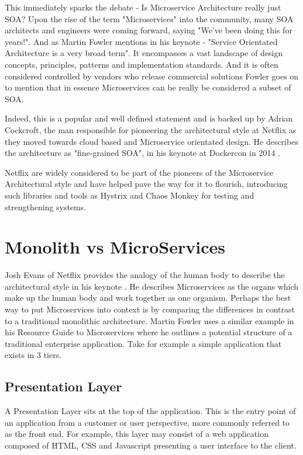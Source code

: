 This immediately sparks the debate - Is Microservice Architecture really just SOA? Upon the rise of the term "Microservices" into the community, many SOA architects and engineers were coming forward, saying "We've been doing this for years!". And as Martin Fowler mentions in his keynote\cite{GOTOConference} -  "Service Orientated Architecture is a very broad term". It encompasses a vast landscape of design concepts, principles, patterns and implementation standards. And it is often considered controlled by vendors who release commercial solutions Fowler goes on to mention that in essence Microservices can be really be considered a subset of SOA.

Indeed, this is a popular and well defined statement and is backed up by Adrian Cockcroft, the man responsible for pioneering the architectural style at Netflix as they moved towards cloud based and Microservice orientated design. He describes the architecture as "fine-grained SOA", in his keynote at Dockercon in 2014 \cite{adriancockcroft}.

Netflix are widely considered to be part of the pioneers of the Microservice Architectural style and have helped pave the way for it to flourish, introducing such libraries and tools as Hystrix\cite{Hystrix} and Chaos Monkey\cite{ChaosMonkey} for testing and strengthening systems.

\section{Monolith vs MicroServices}

Josh Evans of Netflix provides the analogy of the human body to describe the architectural style in his keynote \cite{MasteringChaosNetflix}. He describes Microservices as the organs which make up the human body and work together as one organism.
Perhaps the best way to put Microservices into context is by comparing the differences in contrast to a traditional monolithic architecture. Martin Fowler uses a similar example in his Resource Guide to Microservices where he outlines a potential structure of a traditional enterprise application. \cite{MicroservicesResourceGuide} Take for example a simple application that exists in 3 tiers.

\subsection{Presentation Layer}
A Presentation Layer sits at the top of the application. This is the entry point of an application from a customer or user perspective, more commonly referred to as the front end. For example, this layer may consist of a web application composed of HTML, CSS and Javascript presenting a user interface to the client. 

